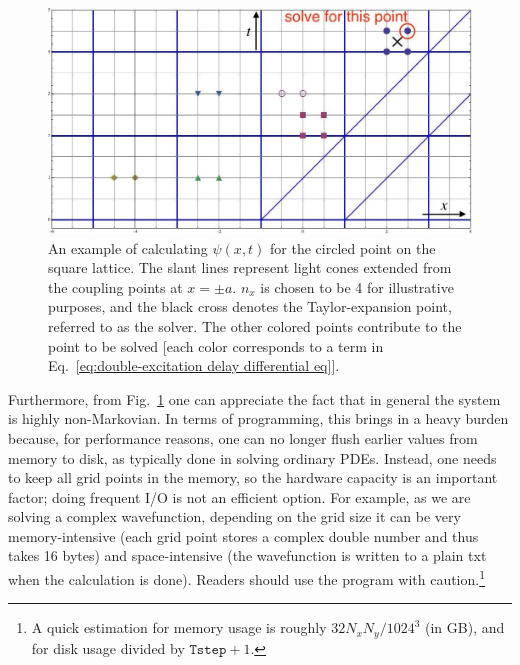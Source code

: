 \documentclass[final,1p,times]{elsarticle}
\newcounter{bla}
\begin{document}
\begin{figure}[htb]
	\centering
	\includegraphics[scale=0.35]{FDTD_grid}
	\caption{An example of calculating $\psi(x,t)$ for the circled point on the square lattice. The slant lines represent light cones extended from the coupling points at $x=\pm a$. $n_x$ is chosen to be 4 for illustrative purposes, and the black cross denotes the Taylor-expansion point, referred to as the solver. The other colored points contribute to the point to be solved [each color corresponds to a term in Eq.~\eqref{eq:double-excitation delay differential eq}].}
	\label{fig:FDTD_grid}
\end{figure}

Furthermore, from Fig.~\ref{fig:FDTD_grid} one can appreciate the fact that in general the system is highly  non-Markovian.
In terms of programming, this brings in a heavy burden because, for performance reasons, one can no longer flush earlier values from memory to disk, as typically done in solving ordinary PDEs. Instead, one needs to keep all grid points in the memory, so the hardware capacity is an important factor; doing frequent I/O is not an efficient option. 
For example, as we are solving a complex wavefunction,
depending on the grid size it can be very memory-intensive (each grid point stores a complex double number and thus takes 16 bytes)
and space-intensive (the wavefunction is written to a plain txt when the calculation is done). Readers should use the program with caution.\footnote{A quick estimation for memory usage is roughly $32N_xN_y/1024^3$ (in GB), and for disk usage divided by $\texttt{Tstep}+1$.}
\end{document}
